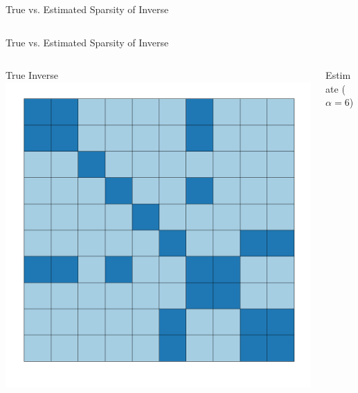 \documentclass{beamer}
\begin{document}
\begin{frame}{True vs. Estimated Sparsity of Inverse}
\begin{columns}
\begin{column}{0.5\textwidth}
\begin{center}
			\end{center}
		\end{column}
	\end{columns}
	\vfill
\end{frame}

\begin{frame}{True vs. Estimated Sparsity of Inverse}
\vfill
\begin{columns}
	\begin{column}{0.5\textwidth}
		\begin{center}
			True Inverse
			\includegraphics[width=\textwidth]{figs/sparse_cov_true.pdf}
		\end{center}
	\end{column}
	\begin{column}{0.5\textwidth}
		\begin{center}
			Estimate ($\alpha = 6$)

\end{center}
\end{column}
\end{columns}
\end{frame}
\end{document}
